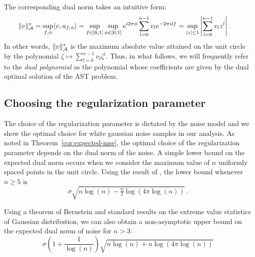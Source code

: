 The corresponding dual norm takes an intuitive form:
\begin{align}
	\|v\|_{\mathcal{A}}^* &= \sup_{{f,\phi}} \langle v, a_{f,\phi} \rangle=\sup_{f\in [0,1]}  \sup_{\phi \in [0,1]}  e^{i 2\pi \phi} \sum_{l=0}^{n-1} v_l e^{-2\pi i l f} =\sup_{ |z|\leq 1 }  \left| \sum_{l=0}^{n-1} v_l z^l\right|.\label{eq:dual-norm-poly}
\end{align}
In other words, $\|v\|_{\mathcal{A}}^*$ is the maximum absolute value attained on the
unit circle by the polynomial $\zeta \mapsto \sum_{l=0}^{n-1} v_l \zeta^l$.  Thus, in what follows, we will frequently refer to the \emph{dual polynomial} as the polynomial whose coefficients are given by the dual optimal solution of the AST problem.

\subsection{Choosing the regularization parameter}\label{subsec:parameter}
The choice of the regularization parameter is dictated by the noise model and
we show the optimal choice for white gaussian noise samples in our analysis. As
noted in Theorem~\ref{cor:expected-mse}, the optimal choice of the
regularization parameter depends on the dual norm of the noise.  A simple
lower bound on the expected dual norm occurs when we consider the maximum
value of $n$ uniformly spaced points in the unit circle. Using the result of
\cite{lr76}, the lower bound whenever $n \geq 5$ is
\[
\sigma\sqrt{n\log(n) - \tfrac{n}{2} \log(4\pi\log(n))}\,.
\]

Using a theorem of Bernstein and standard results on the extreme value
statistics of Gaussian distribution, we can also obtain a non-asymptotic upper
bound on the expected dual norm of noise for $n > 3$:
\[\sigma\left(1  + \frac{1}{\log(n)}\right)\sqrt{n \log(n) + n\log( 4\pi \log(n))}\nonumber
\]

